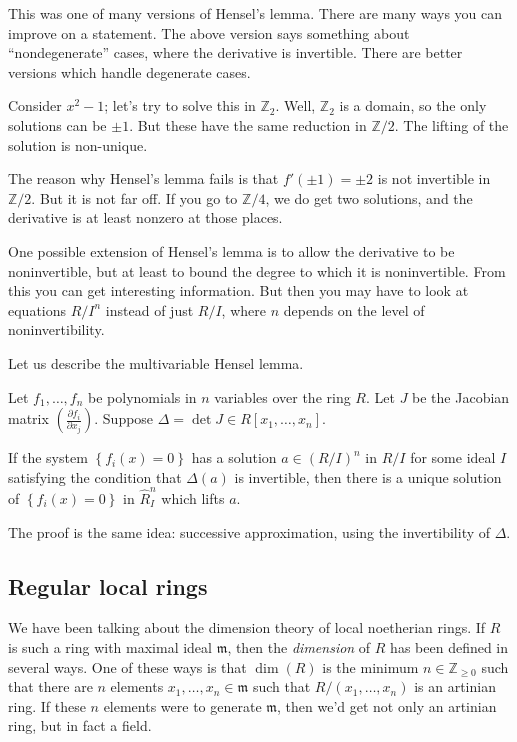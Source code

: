 This was one of many versions of Hensel's lemma. There are many ways you can
improve on a statement. The above version says something about
``nondegenerate'' cases, where the derivative is invertible. There are better
versions which handle degenerate cases.

\begin{example} 
Consider $x^2 - 1$; let's try to solve this in $\mathbb{Z}_2$. Well,
$\mathbb{Z}_2$ is a domain, so the only solutions can be $\pm 1$. But these
have the same reduction in $\mathbb{Z}/2$. The lifting of the solution is
non-unique.

The reason why Hensel's lemma fails is that $f'(\pm 1) = \pm 2$ is not
invertible in $\mathbb{Z}/2$. But it is not far off. If you go to
$\mathbb{Z}/4$, we do get two solutions, and the derivative is at least nonzero
at those places.
\end{example} 

One possible extension of Hensel's lemma is to allow the derivative to be
noninvertible, but at least to bound the degree to which it is noninvertible.
From this you can get interesting information. 
But then you may have to look at equations $R/I^n$ instead of just $R/I$, where
$n$ depends on the level of noninvertibility.

Let us describe the multivariable Hensel lemma.

\begin{theorem} 
Let $f_1, \dots, f_n$ be polynomials in $n$ variables over the ring $R$. Let
$J$ be the Jacobian matrix $( \frac{\partial f_i}{\partial x_j})$. Suppose
$\Delta = \det J \in R[x_1, \dots, x_n]$. 

If the system $\left\{f_i(x) = 0\right\}$ has a solution $a \in (R/I)^n$ in $R/I$ for some
ideal $I$ satisfying the condition that $\Delta(a)$ is invertible, then there
is a unique solution of $\left\{f_i(x) =0\right\}$ in $\hat{R}_I^n$ which lifts $a$. 
\end{theorem} 
The proof is the same idea: successive approximation, using the invertibility
of $\Delta$. 

\subsection{Regular local rings}

We have been talking about the dimension theory of local noetherian rings. If
$R$ is such a ring with maximal ideal $\mathfrak{m}$, then the \emph{dimension}
of $R$ has been defined in several ways. One of these ways is that 
$\dim (R)$ is the minimum $n \in \mathbb{Z}_{\geq 0}$ such that there are $n$
elements $x_1, \dots, x_n \in \mathfrak{m}$ such that $R/(x_1, \dots, x_n)$ is
an artinian ring. If these $n$ elements were to generate $\mathfrak{m}$, then
we'd get not only an artinian ring, but in fact a field. 

